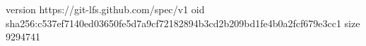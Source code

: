 version https://git-lfs.github.com/spec/v1
oid sha256:c537ef7140ed03650fe5d7a9cf72182894b3cd2b209bd1fe4b0a2fcf679e3cc1
size 9294741
